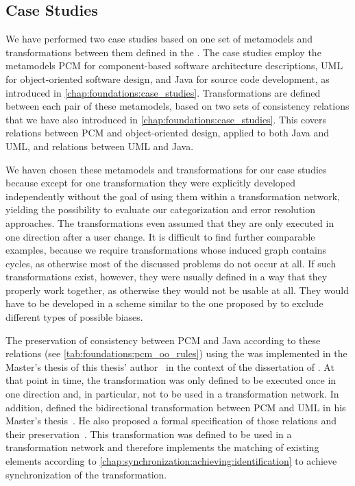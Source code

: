 \subsection{Case Studies}
\label{chap:correctness_evaluation:categorization:case_studies}

We have performed two case studies based on one set of metamodels and transformations between them defined in the \reactionslanguage.
The case studies employ the metamodels \gls{PCM} for component-based software architecture descriptions, \gls{UML} for object-oriented software design, and Java for source code development, as introduced in \autoref{chap:foundations:case_studies}.
Transformations are defined between each pair of these metamodels, based on two sets of consistency relations that we have also introduced in \autoref{chap:foundations:case_studies}.
This covers relations between \gls{PCM} and object-oriented design, applied to both Java and \gls{UML}, and relations between \gls{UML} and Java.

We haven chosen these metamodels and transformations for our case studies because except for one transformation they were explicitly developed independently without the goal of using them within a transformation network, yielding the possibility to evaluate our categorization and error resolution approaches.
The transformations even assumed that they are only executed in one direction after a user change.
It is difficult to find further comparable examples, because we require transformations whose induced graph contains cycles, as otherwise most of the discussed problems do not occur at all.
If such transformations exist, however, they were usually defined in a way that they properly work together, as otherwise they would not be usable at all.
They would have to be developed in a scheme similar to the one proposed by  to exclude different types of possible biases.

The preservation of consistency between \gls{PCM} and Java according to these relations (see \autoref{tab:foundations:pcm_oo_rules}) using the \reactionslanguage was implemented in the Master's thesis of this thesis' author~ in the context of the dissertation of \textcite{langhammer2017a}.
At that point in time, the transformation was only defined to be executed once in one direction and, in particular, not to be used in a transformation network.
In addition, \citeauthor{syma2018ma} defined the bidirectional transformation between \gls{PCM} and \gls{UML} in his Master's thesis~.
He also proposed a formal specification of those relations and their preservation~.
This transformation was defined to be used in a transformation network and therefore implements the matching of existing elements according to \autoref{chap:synchronization:achieving:identification} to achieve synchronization of the transformation.


